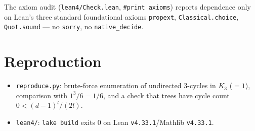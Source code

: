\documentclass[11pt]{article}
\begin{document}
\noindent The axiom audit (\texttt{lean4/Check.lean}, \texttt{\#print axioms})
reports dependence only on Lean's three standard foundational axioms
\texttt{propext}, \texttt{Classical.choice}, \texttt{Quot.sound} --- no
\texttt{sorry}, no \texttt{native\_decide}.

\section{Reproduction}

\begin{itemize}
  \item \texttt{reproduce.py}: brute-force enumeration of undirected
        $3$-cycles in $K_3$ ($=1$), comparison with $1^3/6 = 1/6$, and a
        check that trees have cycle count $0 < (d-1)^l/(2l)$.
  \item \texttt{lean4/}: \texttt{lake build} exits $0$ on Lean
        \texttt{v4.33.1}/Mathlib \texttt{v4.33.1}.
\end{itemize}
\end{document}
